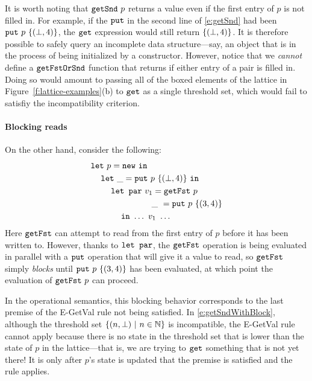 It is worth noting that $\mbox{\texttt{getSnd}}~p$ returns a value even if the
first entry of $p$ is not filled in.  For example, if the $\mbox{\texttt{put}}$ in
the second line of \eqref{e:getSnd} had been
$\mbox{\texttt{put}}~p~\lbrace (\bot,4) \rbrace$, the $\mbox{\texttt{get}}$ expression would still
return $\lbrace (\bot,4) \rbrace$.  It is therefore possible to safely
query an incomplete data structure---say, an object that is in the
process of being initialized by a constructor.  However, notice that
we {\em cannot} define a $\mbox{\texttt{getFstOrSnd}}$ function that returns if
either entry of a pair is filled in.  Doing so would amount to passing
all of the boxed elements of the lattice in
Figure~\ref{f:lattice-examples}(b) to $\mbox{\texttt{get}}$ as a single threshold
set, which would fail to satisfiy the incompatibility criterion.

\paragraph{Blocking reads}

On the other hand, consider the following:
\begin{equation}
\begin{split}
& \letexp{p}{\NEW}{ \\
& \letspace \letexp{\_}{\putexp{p}{\stateset{(\bot,4)}}}{ \\
& \letspace \letspace \LETPAR ~v_1 = \getfstexp{p} \\
& \letspace \letspace \letparspace \hspace{0.62em}\_~= \putexp{p}{\stateset{(3,4)}} \\
& \letspace \letspace \letspace \IN~ \dots~v_1~\dots }}
\end{split}
\label{e:getSndWithBlock}
\end{equation}
Here $\mbox{\texttt{getFst}}$ can attempt to read from the first entry of $p$ before
it has been written to.  However, thanks to $\mbox{\texttt{\mbox{\texttt{let}}~\mbox{\texttt{par}}}}$, the $\mbox{\texttt{getFst}}$
operation is being evaluated in parallel with a $\mbox{\texttt{put}}$ operation that
will give it a value to read, so $\mbox{\texttt{getFst}}$ simply {\em blocks} until
$\mbox{\texttt{put}}~p~\lbrace (3,4) \rbrace$ has been evaluated, at which point the
evaluation of $\mbox{\texttt{getFst}}~p$ can proceed.

In the operational semantics, this blocking behavior corresponds to
the last premise of the {\sc E-GetVal} rule not being satisfied.  In
\eqref{e:getSndWithBlock}, although the threshold set $\lbrace (n,
  \bot) \ | \  n \in \mathbb{N} \rbrace$ is incompatible, the {\sc E-GetVal}
rule cannot apply because there is no state in the threshold set that
is lower than the state of $p$ in the lattice---that is, we are trying
to $\mbox{\texttt{get}}$ something that is not yet there!  It is only after $p$'s
state is updated that the premise is satisfied and the rule applies.
